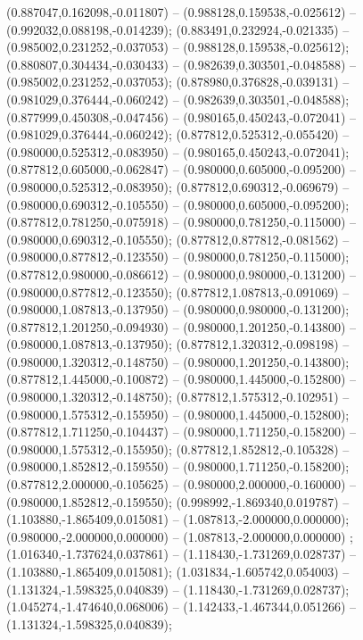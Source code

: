  (0.887047,0.162098,-0.011807) -- (0.988128,0.159538,-0.025612) -- (0.992032,0.088198,-0.014239);
 (0.883491,0.232924,-0.021335) -- (0.985002,0.231252,-0.037053) -- (0.988128,0.159538,-0.025612);
 (0.880807,0.304434,-0.030433) -- (0.982639,0.303501,-0.048588) -- (0.985002,0.231252,-0.037053);
 (0.878980,0.376828,-0.039131) -- (0.981029,0.376444,-0.060242) -- (0.982639,0.303501,-0.048588);
 (0.877999,0.450308,-0.047456) -- (0.980165,0.450243,-0.072041) -- (0.981029,0.376444,-0.060242);
 (0.877812,0.525312,-0.055420) -- (0.980000,0.525312,-0.083950) -- (0.980165,0.450243,-0.072041);
 (0.877812,0.605000,-0.062847) -- (0.980000,0.605000,-0.095200) -- (0.980000,0.525312,-0.083950);
 (0.877812,0.690312,-0.069679) -- (0.980000,0.690312,-0.105550) -- (0.980000,0.605000,-0.095200);
 (0.877812,0.781250,-0.075918) -- (0.980000,0.781250,-0.115000) -- (0.980000,0.690312,-0.105550);
 (0.877812,0.877812,-0.081562) -- (0.980000,0.877812,-0.123550) -- (0.980000,0.781250,-0.115000);
 (0.877812,0.980000,-0.086612) -- (0.980000,0.980000,-0.131200) -- (0.980000,0.877812,-0.123550);
 (0.877812,1.087813,-0.091069) -- (0.980000,1.087813,-0.137950) -- (0.980000,0.980000,-0.131200);
 (0.877812,1.201250,-0.094930) -- (0.980000,1.201250,-0.143800) -- (0.980000,1.087813,-0.137950);
 (0.877812,1.320312,-0.098198) -- (0.980000,1.320312,-0.148750) -- (0.980000,1.201250,-0.143800);
 (0.877812,1.445000,-0.100872) -- (0.980000,1.445000,-0.152800) -- (0.980000,1.320312,-0.148750);
 (0.877812,1.575312,-0.102951) -- (0.980000,1.575312,-0.155950) -- (0.980000,1.445000,-0.152800);
 (0.877812,1.711250,-0.104437) -- (0.980000,1.711250,-0.158200) -- (0.980000,1.575312,-0.155950);
 (0.877812,1.852812,-0.105328) -- (0.980000,1.852812,-0.159550) -- (0.980000,1.711250,-0.158200);
 (0.877812,2.000000,-0.105625) -- (0.980000,2.000000,-0.160000) -- (0.980000,1.852812,-0.159550);
 (0.998992,-1.869340,0.019787) -- (1.103880,-1.865409,0.015081) -- (1.087813,-2.000000,0.000000);
 (0.980000,-2.000000,0.000000) -- (1.087813,-2.000000,0.000000) ;
 (1.016340,-1.737624,0.037861) -- (1.118430,-1.731269,0.028737) -- (1.103880,-1.865409,0.015081);
 (1.031834,-1.605742,0.054003) -- (1.131324,-1.598325,0.040839) -- (1.118430,-1.731269,0.028737);
 (1.045274,-1.474640,0.068006) -- (1.142433,-1.467344,0.051266) -- (1.131324,-1.598325,0.040839);
